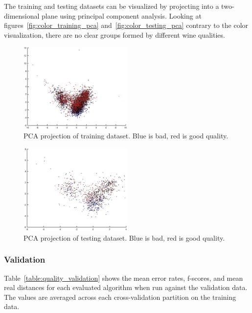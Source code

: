 \documentclass[twoside]{article}
\begin{document}
\begin{multicols}{2}
The training and testing datasets can be visualized by projecting into a two-dimensional plane using principal component analysis. Looking at
figures~\ref{fig:color_training_pca} and~\ref{fig:color_testing_pca} contrary to the color visualization, there are no clear groups
formed by different wine qualities.

\begin{figure}[H]
\centering
\includegraphics[width=0.5\textwidth]{qpcatraining}
\caption{PCA projection of training dataset. Blue is bad, red is good quality.}
\label{fig:quality_training_pca}
\end{figure}

\begin{figure}[H]
\centering
\includegraphics[width=0.5\textwidth]{qpcatesting}
\caption{PCA projection of testing dataset. Blue is bad, red is good quality.}
\label{fig:quality_testing_pca}
\end{figure}

\subsubsection{Validation}

Table~\ref{table:quality_validation} shows the mean error rates, f-scores, and mean real distances for each evaluated algorithm when run against the validation data. The values are averaged across each
cross-validation partition on the training data.


\end{multicols}
\end{document}
